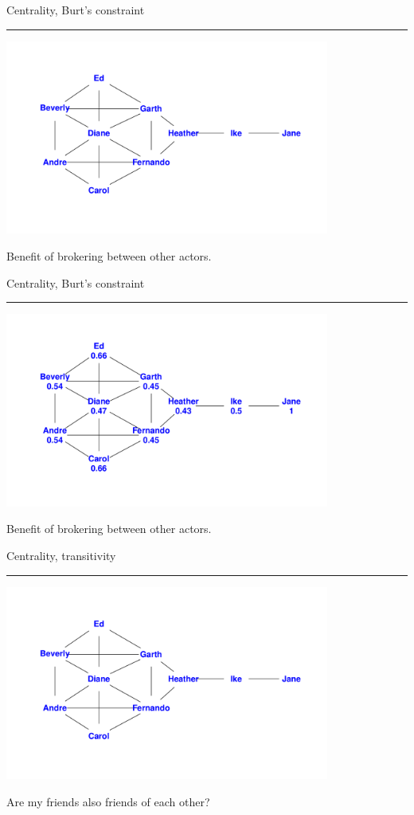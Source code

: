\documentclass[landscape,fleqno]{foils}
\newcommand{\stitle}[1]{{\color{blue}\Large #1\par\vspace*{10pt}\hrule}}
\begin{document}
\newpage
\stitle{Centrality, Burt's constraint}
\begin{center}
\includegraphics[width=0.8\textwidth]{centnet}
\par Benefit of brokering between other actors.
\end{center}

\newpage
\stitle{Centrality, Burt's constraint}
\begin{center}
\includegraphics[width=0.8\textwidth]{centnet-constraint}
\par Benefit of brokering between other actors.
\end{center}



\newpage
\stitle{Centrality, transitivity}
\begin{center}
\includegraphics[width=0.8\textwidth]{centnet}
\par Are my friends also friends of each other?
\end{center}
\end{document}
